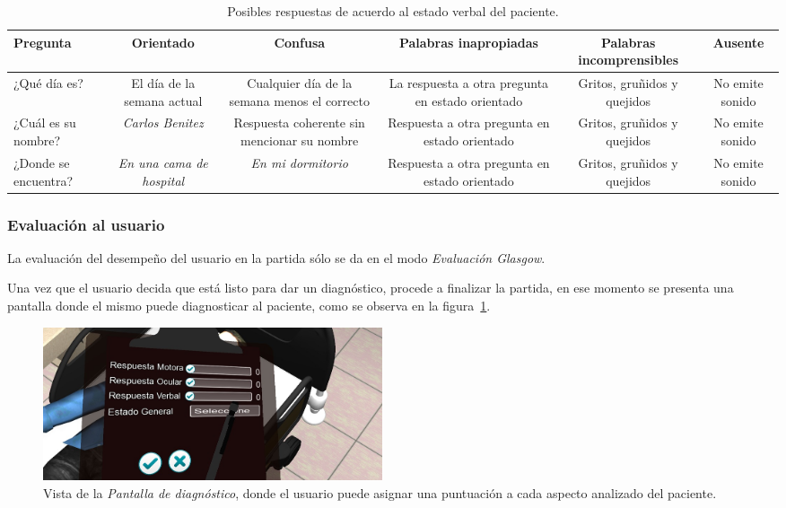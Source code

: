 \begin{itemize}
\begin{table}[H]
\centering
\begin{tabulary}{\textwidth}{LCCCCC}
\toprule
\textbf{Pregunta} & \textbf{Orientado} & \textbf{Confusa} & \textbf{Palabras
    inapropiadas} & \textbf{Palabras incomprensibles} & \textbf{Ausente} \\
\midrule
¿Qué día es? & El día de la semana actual & Cualquier día de la semana menos el
correcto & La respuesta a otra pregunta en estado orientado & Gritos, gruñidos y
quejidos & No emite sonido \\
¿Cuál es su nombre? & \emph{Carlos Benitez} & Respuesta coherente sin mencionar
su nombre & Respuesta a otra pregunta en estado orientado & Gritos, gruñidos y
quejidos & No emite sonido \\
¿Donde se encuentra? & \emph{En una cama de hospital} & \emph{En mi dormitorio} &
Respuesta a otra pregunta en estado orientado & Gritos, gruñidos y quejidos & No
emite sonido \\
\bottomrule
\end{tabulary}
\caption{Posibles respuestas de acuerdo al estado verbal del paciente.}
\label{tab:glasgow_opciones_respuesta}
\end{table}

\end{itemize}

\subsubsection{Evaluación al usuario}
\label{sec:puntuacion_glasgow}

La evaluación del desempeño del usuario en la partida sólo se da en el modo \emph{Evaluación 
Glasgow}. %

Una vez que el usuario decida que está listo para dar un diagnóstico, procede a
finalizar la partida, en ese momento se presenta una pantalla donde el mismo
puede diagnosticar al paciente, como se observa en la
figura~\ref{fig:glasgow_gui_resultados}.

\begin{figure}[H]
\centering
\includegraphics[width=10cm]{solucion/images/glasgow_diagnostico.jpg}
\caption{Vista de la \emph{Pantalla de diagnóstico}, donde el usuario puede
    asignar una puntuación a cada aspecto analizado del paciente.}
\label{fig:glasgow_gui_resultados}
\end{figure}

